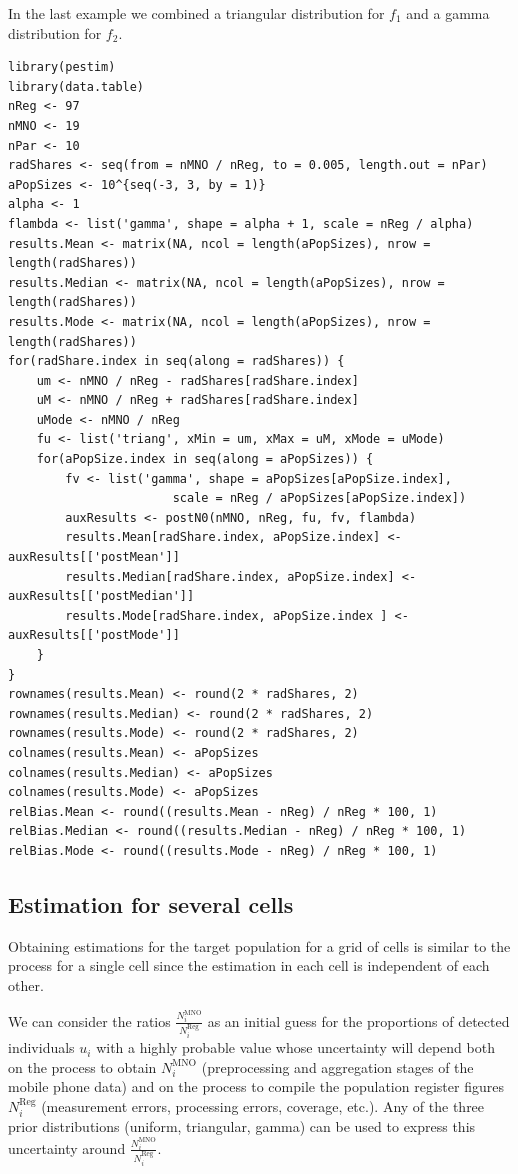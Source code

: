 \documentclass[12pt, a4paper]{article}
\begin{document}
In the last example we combined a triangular distribution for $f_{1}$ and a gamma distribution for $f_{2}$.
\begin{verbatim}
library(pestim)
library(data.table)
nReg <- 97
nMNO <- 19
nPar <- 10
radShares <- seq(from = nMNO / nReg, to = 0.005, length.out = nPar)
aPopSizes <- 10^{seq(-3, 3, by = 1)}
alpha <- 1
flambda <- list('gamma', shape = alpha + 1, scale = nReg / alpha)
results.Mean <- matrix(NA, ncol = length(aPopSizes), nrow = length(radShares))
results.Median <- matrix(NA, ncol = length(aPopSizes), nrow = length(radShares))
results.Mode <- matrix(NA, ncol = length(aPopSizes), nrow = length(radShares))
for(radShare.index in seq(along = radShares)) {
    um <- nMNO / nReg - radShares[radShare.index]
    uM <- nMNO / nReg + radShares[radShare.index]
    uMode <- nMNO / nReg
    fu <- list('triang', xMin = um, xMax = uM, xMode = uMode)
    for(aPopSize.index in seq(along = aPopSizes)) {
        fv <- list('gamma', shape = aPopSizes[aPopSize.index], 
                       scale = nReg / aPopSizes[aPopSize.index])
        auxResults <- postN0(nMNO, nReg, fu, fv, flambda)
        results.Mean[radShare.index, aPopSize.index] <- auxResults[['postMean']] 
        results.Median[radShare.index, aPopSize.index] <- auxResults[['postMedian']]
        results.Mode[radShare.index, aPopSize.index ] <- auxResults[['postMode']]
    }
}
rownames(results.Mean) <- round(2 * radShares, 2)
rownames(results.Median) <- round(2 * radShares, 2)
rownames(results.Mode) <- round(2 * radShares, 2)
colnames(results.Mean) <- aPopSizes
colnames(results.Median) <- aPopSizes
colnames(results.Mode) <- aPopSizes
relBias.Mean <- round((results.Mean - nReg) / nReg * 100, 1)
relBias.Median <- round((results.Median - nReg) / nReg * 100, 1)
relBias.Mode <- round((results.Mode - nReg) / nReg * 100, 1)
\end{verbatim}


\subsection{Estimation for several cells}

Obtaining estimations for the target population for a grid of cells is similar to the process for a single cell 
since the estimation in each cell is independent of each other.

We can consider the ratios $\frac{N_{i}^{\textrm{MNO}}}{N^{\textrm{Reg}}_{i}}$ 
as an initial guess for the proportions of detected individuals $u_{i}$ 
with a highly probable value whose uncertainty will depend both on the process to obtain $N_{i}^{\textrm{MNO}}$ 
(preprocessing and aggregation stages of the mobile phone data) 
and on the process to compile the population register figures $N_{i}^{\textrm{Reg}}$ 
(measurement errors, processing errors, coverage, etc.). 
Any of the three prior distributions (uniform, triangular, gamma) can be used to express this 
uncertainty around $\frac{N_{i}^{\textrm{MNO}}}{N^{\textrm{Reg}}_{i}}$. 
\end{document}
